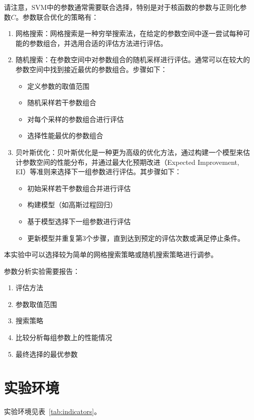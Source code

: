 \documentclass[12pt]{article}
\begin{document}
请注意，SVM中的参数通常需要联合选择，特别是对于核函数的参数与正则化参数\(C\)。参数联合优化的策略有：
\begin{enumerate}
  \item 网格搜索：网格搜索是一种穷举搜索法，在给定的参数空间中逐一尝试每种可能的参数组合，并选用合适的评估方法进行评估。
  \item 随机搜索：在参数空间中对参数组合的随机采样进行评估。通常可以在较大的参数空间中找到接近最优的参数组合。步骤如下：
        \begin{itemize}
          \item 定义参数的取值范围
          \item 随机采样若干参数组合
          \item 对每个采样的参数组合进行评估
          \item 选择性能最优的参数组合
        \end{itemize}
  \item 贝叶斯优化：贝叶斯优化是一种更为高级的优化方法，通过构建一个模型来估计参数空间的性能分布，并通过最大化预期改进（Expected Improvement, EI）等准则来选择下一组参数进行评估。其步骤如下：
        \begin{itemize}
          \item 初始采样若干参数组合并进行评估
          \item 构建模型（如高斯过程回归）
          \item 基于模型选择下一组参数进行评估
          \item 更新模型并重复第3个步骤，直到达到预定的评估次数或满足停止条件。
        \end{itemize}
\end{enumerate}



本实验中可以选择较为简单的网格搜索策略或随机搜索策略进行调参。

参数分析实验需要报告：

\begin{enumerate}
  \item 评估方法
  \item 参数取值范围
  \item 搜索策略
  \item 比较分析每组参数上的性能情况
  \item 最终选择的最优参数
\end{enumerate}



\section{实验环境}
实验环境见表~\ref{tab:indicators}。
\end{document}
